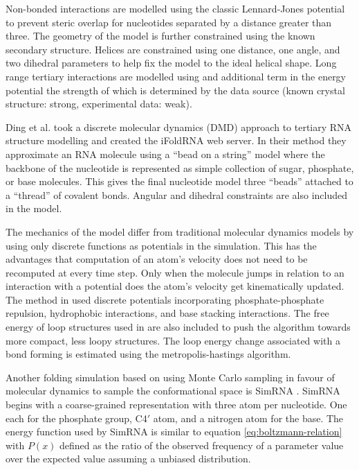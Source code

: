\documentclass[journal]{IEEEtran}
\begin{document}
Non-bonded interactions are modelled using the classic Lennard-Jones potential to prevent steric overlap for nucleotides separated by a distance greater than three. The geometry of the model is further constrained using the known secondary structure. Helices are constrained using one distance, one angle, and two dihedral parameters to help fix the model to the ideal helical shape. Long range tertiary interactions are modelled using and additional term in the energy potential the strength of which is determined by the data source (known crystal structure: strong, experimental data: weak).

Ding et al. \cite{ding2008ab} took a discrete molecular dynamics (DMD) approach to tertiary RNA structure modelling and created the iFoldRNA web server. In their method they approximate an RNA molecule using a ``bead on a string'' model where the backbone of the nucleotide is represented as simple collection of sugar, phosphate, or base molecules. This gives the final nucleotide model three ``beads'' attached to a ``thread'' of covalent bonds. Angular and dihedral constraints are also included in the model.

The mechanics of the model differ from traditional molecular dynamics models by using only discrete functions as potentials in the simulation. This has the advantages that computation of an atom's velocity does not need to be recomputed at every time step. Only when the molecule jumps in relation to an interaction with a potential does the atom's velocity get kinematically updated. The method in \cite{ding2008ab} used discrete potentials incorporating phosphate-phosphate repulsion, hydrophobic interactions, and base stacking interactions. The free energy of loop structures used in \cite{mathews1999expanded} are also included to push the algorithm towards more compact, less loopy structures. The loop energy change associated with a bond forming is estimated using the metropolis-hastings algorithm.

Another folding simulation based on using Monte Carlo sampling in favour of molecular dynamics to sample the conformational space is SimRNA \cite{rother2012template}. SimRNA begins with a coarse-grained representation with three atom per nucleotide. One each for the phosphate group, C4$'$ atom, and a nitrogen atom for the base. The energy function used by SimRNA is similar to equation \ref{eq:boltzmann-relation} with $P(x)$ defined as the ratio of the observed frequency of a parameter value over the expected value assuming a unbiased distribution. 
\end{document}
